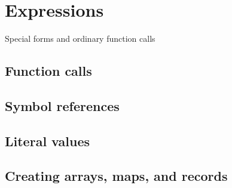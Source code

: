 \documentclass{article}
\theoremstyle{definition}
\begin{document}
\hypertarget{hsec:expressions}{}
\section{Expressions}
\label{sec:expressions}

Special forms and ordinary function calls

\hypertarget{hsec:function-call}{}
\subsection{Function calls}
\label{sec:function-call}

\hypertarget{hsec:symbol-ref}{}
\subsection{Symbol references}
\label{sec:symbol-ref}

\hypertarget{hsec:literals}{}
\subsection{Literal values}
\label{sec:literals}



\hypertarget{hsec:new-form}{}
\subsection{Creating arrays, maps, and records}
\label{sec:new-form}

\end{document}
